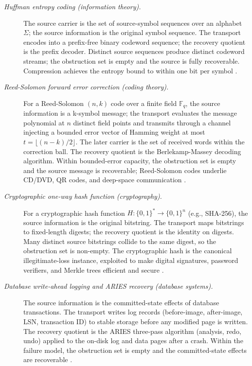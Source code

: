 \documentclass[11pt]{article}
\theoremstyle{definition}
\begin{document}
\begin{description}
\item[\emph{Huffman entropy coding (information theory).}]
The source carrier is the set of source-symbol sequences
over an alphabet \(\Sigma\); the source information is
the original symbol sequence.  The transport encodes
into a prefix-free binary codeword sequence; the
recovery quotient is the prefix decoder.  Distinct
source sequences produce distinct codeword streams; the
obstruction set is empty and the source is fully
recoverable.  Compression achieves the entropy bound to
within one bit per symbol
\citep{Huffman1952Method}.

\item[\emph{Reed-Solomon forward error correction
(coding theory).}]
For a Reed-Solomon \((n,k)\) code over a finite field
\(\mathbb F_q\), the source information is a
k-symbol message; the transport evaluates the
message polynomial at \(n\) distinct field points and
transmits through a channel injecting a bounded error
vector of Hamming weight at most
\(t=\lfloor(n-k)/2\rfloor\).  The later carrier is the
set of received words within the correction ball.  The
recovery quotient is the Berlekamp-Massey decoding
algorithm.  Within bounded-error capacity, the
obstruction set is empty and the source message is
recoverable; Reed-Solomon codes underlie CD/DVD, QR
codes, and deep-space communication
\citep{ReedSolomon1960Codes}.

\item[\emph{Cryptographic one-way hash function
(cryptography).}]
For a cryptographic hash function
\(H:\{0,1\}^*\to\{0,1\}^n\) (e.g., SHA-256), the
source information is the original bitstring.  The
transport maps bitstrings to fixed-length digests;
the recovery quotient is the identity on digests.
Many distinct source bitstrings collide to the same
digest, so the obstruction set is non-empty.  The
cryptographic hash is the canonical illegitimate-loss
instance, exploited to make digital signatures,
password verifiers, and Merkle trees efficient and
secure \citep{NIST2015FIPS180}.

\item[\emph{Database write-ahead logging and {ARIES}
recovery (database systems).}]
The source information is the committed-state effects
of database transactions.  The transport writes log
records (before-image, after-image, LSN, transaction
ID) to stable storage before any modified page is
written.  The recovery quotient is the ARIES
three-pass algorithm (analysis, redo, undo) applied
to the on-disk log and data pages after a crash.
Within the failure model, the obstruction set is
empty and the committed-state effects are recoverable
\citep{Mohan1992ARIES}.


\end{description}
\end{document}
